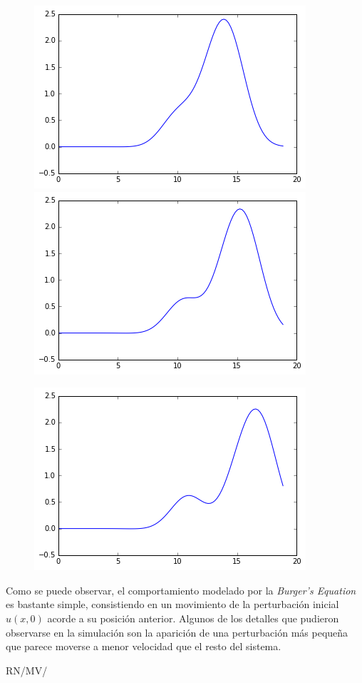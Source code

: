 \documentclass[spanish, fleqn]{article}
\begin{document}
    \begin{figure}[H]
      \centering
      \begin{minipage}{.5\textwidth}
        \centering
        \includegraphics[scale=0.6]{t3000.png}
      \end{minipage}%
      \begin{minipage}{.5\textwidth}
        \centering
        \includegraphics[scale=0.6]{t4000.png}
      \end{minipage}
    \end{figure}
    \begin{figure}[H]
      \centering
      \begin{minipage}{.5\textwidth}
        \centering
        \includegraphics[scale=0.6]{t5000.png}
      \end{minipage}%
    \end{figure}
    Como se puede observar, el comportamiento modelado por la \textit{Burger's Equation} es bastante simple, consistiendo en un
    movimiento de la perturbación inicial $u(x,0)$ acorde a su posición anterior. Algunos de los detalles que pudieron 
    observarse en la simulación son la aparición de una perturbación más pequeña que parece moverse a menor velocidad que el
    resto del sistema.
    
\vfill\hfill RN/MV/\LaTeXe
\end{document}
